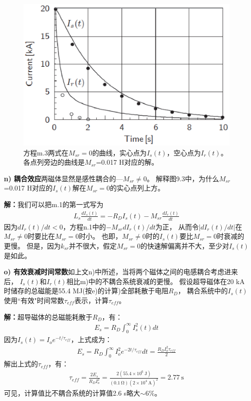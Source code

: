 \begin{figure}
	\centering
	\includegraphics[scale=0.6]{chpt9/figs/fig9.3.eps}
	\caption{方程m.3两式在$M_{sr}=0$的曲线，实心点为$I_s(t)$，空心点为$I_r(t)$。各点列旁边的曲线是$M_{sr}$=0.017 H对应的解。}
\end{figure}

\textbf{n) 耦合效应}\qquad 两磁体显然是感性耦合的---$M_{sr}\neq 0$。
解释图9.3中，为什么$M_{sr}$=0.017 H对应的$I_s(t)$解在$M_{sr}=0$的实心点列上方。

\textbf{解：}我们可以把m.1的第一式写为
\begin{align*}%
L_s\frac{dI_s(t)}{dt}=-R_DI_s(t)-M_{sr}\frac{dI_r(t)}{dt} \tag{n.1}
\end{align*}
因为$dI_r(t)/dt<0$，方程n.1中的$-M_{sr}dI_r(t)/dt$为正，
从而令$|dI_r(t)/dt|$在$M_{sr}\neq 0$时要比在$M_{sr}=0$时小。
也即，$M_{sr}\neq 0$时的$I_s(t)$要比$M_{sr}=0$时衰减的更慢。
但是，因为$k_{sr}$并不很大，假定$M_{sr}=0$的快速解偏离并不大，至少对$I_s(t)$是如此。

\textbf{o) 有效衰减时间常数}\qquad 如上文n)中所述，当将两个磁体之间的电感耦合考虑进来后，
$I_s(t)$和$I_r(t)$相比m)中的不耦合系统衰减的更慢。
假设超导磁体在20 kA时储存的总磁能是55.4 MJ(按e)的计算)全部耗散于电阻$R_D$，
耦合系统中的$I_s(t)$使用``有效"时间常数$\tau_{eff}$表示，计算$\tau_{eff}$。

\textbf{解：}超导磁体的总磁能耗散于$R_D$，有：
\begin{align*}%
E_s=R_D\int_{0}^{\infty}I_s^2(t)dt \tag{o.1a}
\end{align*}
因为$I_s(t)=I_o e^{-t/\tau_{eff}}$，上式成为：
\begin{align*}%
E_s=R_D\int_{0}^{\infty}I_{o}^2e^{-2t/\tau_{eff}}dt=\frac{R_DI_o^2\tau_{eff}}{2} \tag{o.1b}
\end{align*}
解出上式的$\tau_{eff}$，有：
\begin{align*}%
\tau_{eff}=\frac{2E_s}{R_DI_o^2}=\frac{2(55.4\times10^6\ \mathrm{J})}{(0.1\ \mathrm{\Omega})(2\times10^4\ \mathrm{A})^2}=2.77\ \mathrm{s}
\end{align*}
可见，计算值比不耦合系统的计算值2.6 s略大$\sim6\%$。

